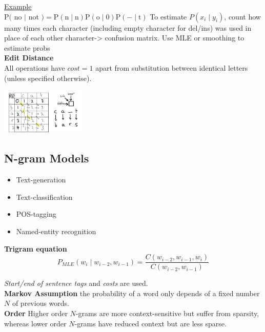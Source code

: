 \documentclass[8pt]{extarticle} %
\begin{document}
\begin{multicols*}{3}
\underline{Example}\\
$\mathrm{P}($ no $\mid$ not $)=\mathrm{P}(\mathrm{n} \mid \mathrm{n}) \mathrm{P}(\mathrm{o} \mid 0) \mathrm{P}(-\mid \mathrm{t})$
To estimate $P\left(x_i \mid y_i\right)$, count how many times each character (including empty character for del/ins) was used in place of each other character-> confusion matrix. Use MLE or smoothing to estimate probs\\

\textbf{Edit Distance}\\

All operations have $cost = 1$ apart from substitution between identical letters (unless specified otherwise).
\begin{center}
    \includegraphics[width=0.3\textwidth]{media/edit.jpg}
\end{center}

\subsection*{N-gram Models}
\begin{itemize}[label=\textbullet, labelsep=0.3em, leftmargin=0.5em, itemsep=0em]
    \item Text-generation
    \item Text-classification
    \item POS-tagging
    \item Named-entity recognition  
\end{itemize}
\textbf{Trigram equation}$$P_{M L E}\left(w_i \mid w_{i-2}, w_{i-1}\right)=\frac{C\left(w_{i-2}, w_{i-1}, w_i\right)}{C\left(w_{i-2}, w_{i-1}\right)}$$

\textit{Start/end of sentence tags} and \textit{costs} are used. \\

\textbf{Markov Assumption} the probability of a word only depends of a fixed number $N$ of previous words. \\

\textbf{Order} Higher order $N$-grams are more context-sensitive but suffer from sparsity, whereas lower order $N$-grams have reduced context but are less sparse.\\


\end{multicols*}
\end{document}
